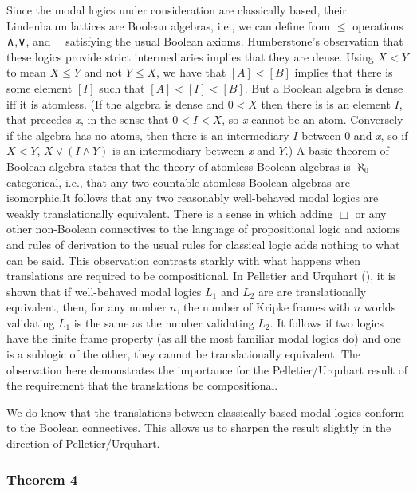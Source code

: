 \documentclass[
  11pt,
  letterpaper,
  DIV=11,
  numbers=noendperiod,
  twoside]{scrartcl}
\begin{document}
Since the modal logics under consideration are classically based, their
Lindenbaum lattices are Boolean algebras, i.e., we can define from
\(\le\) operations ∧,∨, and \(\neg\) satisfying the usual Boolean
axioms. Humberstone's observation that these logics provide strict
intermediaries implies that they are dense. Using \(X{<}Y\) to mean
\(X\le Y\) and not \(Y\le X\), we have that \([A]{<}[B]\) implies that
there is some element \([I]\) such that \([A]{<}[I]{<}[B]\). But a
Boolean algebra is dense iff it is atomless. (If the algebra is dense
and \(0{<}X\) then there is is an element \(I\), that precedes \emph{x},
in the sense that \(0{<}I{<}X\), so \emph{x} cannot be an atom.
Conversely if the algebra has no atoms, then there is an intermediary
\(I\) between \(0\) and \emph{x}, so if \(X{<}Y\), \(X\vee (I\wedge Y)\)
is an intermediary between \emph{x} and \(Y\).) A basic theorem of
Boolean algebra states that the theory of atomless Boolean algebras is
\(\aleph_0\)-categorical, i.e., that any two countable atomless Boolean
algebras are isomorphic.It follows that any two reasonably well-behaved
modal logics are weakly translationally equivalent. There is a sense in
which adding \(\Box\) or any other non-Boolean connectives to the
language of propositional logic and axioms and rules of derivation to
the usual rules for classical logic adds nothing to what can be said.
This observation contrasts starkly with what happens when translations
are required to be compositional. In Pelletier and Urquhart
(), it is shown that if
well-behaved modal logics \(L_1\) and \(L_2\) are are translationally
equivalent, then, for any number \(n\), the number of Kripke frames with
\(n\) worlds validating \(L_1\) is the same as the number validating
\(L_2\). It follows if two logics have the finite frame property (as all
the most familiar modal logics do) and one is a sublogic of the other,
they cannot be translationally equivalent. The observation here
demonstrates the importance for the Pelletier/Urquhart result of the
requirement that the translations be compositional.

We do know that the translations between classically based modal logics
conform to the Boolean connectives. This allows us to sharpen the result
slightly in the direction of Pelletier/Urquhart.

\subsubsection*{Theorem 4}\label{theorem-4}
\end{document}
